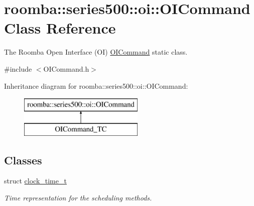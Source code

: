 \hypertarget{classroomba_1_1series500_1_1oi_1_1_o_i_command}{\section{roomba\+:\+:series500\+:\+:oi\+:\+:O\+I\+Command Class Reference}
\label{classroomba_1_1series500_1_1oi_1_1_o_i_command}
}


The Roomba Open Interface (O\+I) \hyperlink{classroomba_1_1series500_1_1oi_1_1_o_i_command}{O\+I\+Command} static class.  




{\ttfamily \#include $<$O\+I\+Command.\+h$>$}

Inheritance diagram for roomba\+:\+:series500\+:\+:oi\+:\+:O\+I\+Command\+:\begin{figure}[H]
\begin{center}
\leavevmode
\includegraphics[height=2.000000cm]{classroomba_1_1series500_1_1oi_1_1_o_i_command}
\end{center}
\end{figure}
\subsection*{Classes}
\begin{DoxyCompactItemize}
\item 
struct \hyperlink{structroomba_1_1series500_1_1oi_1_1_o_i_command_1_1clock__time__t}{clock\+\_\+time\+\_\+t}
\begin{DoxyCompactList}\small\item\em Time representation for the scheduling methods. \end{DoxyCompactList}\end{DoxyCompactItemize}
